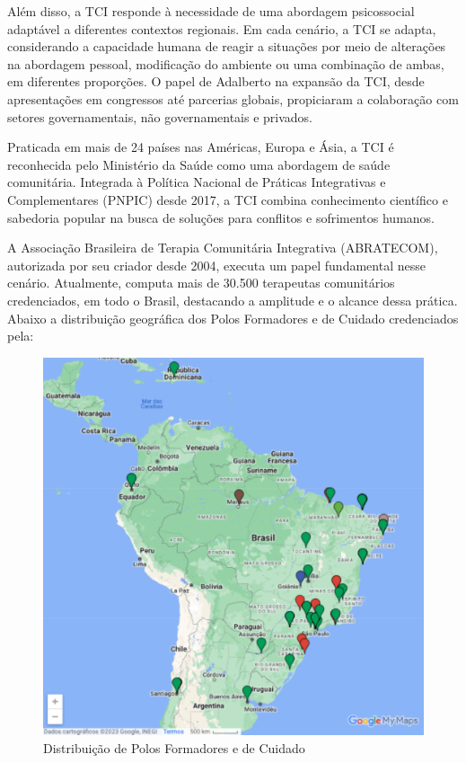         Além disso, a TCI responde à necessidade de uma abordagem psicossocial adaptável a diferentes contextos regionais. Em cada cenário, a TCI se adapta, considerando a capacidade humana de reagir a situações por meio de alterações na abordagem pessoal, modificação do ambiente ou uma combinação de ambas, em diferentes proporções.\cite{DANTAS} O papel de Adalberto na expansão da TCI, desde apresentações em congressos até parcerias globais, propiciaram a colaboração com setores governamentais, não governamentais e privados.\cite{GOMES}
        
        Praticada em mais de 24 países nas Américas, Europa e Ásia, a TCI é reconhecida pelo Ministério da Saúde como uma abordagem de saúde comunitária. Integrada à Política Nacional de Práticas Integrativas e Complementares (PNPIC) desde 2017, a TCI combina conhecimento científico e sabedoria popular na busca de soluções para conflitos e sofrimentos humanos.\cite{ABRATECOM}
        
        A Associação Brasileira de Terapia Comunitária Integrativa (ABRATECOM), autorizada por seu criador desde 2004, executa um papel fundamental nesse cenário. Atualmente, computa mais de 30.500 terapeutas comunitários credenciados, em todo o Brasil, destacando a amplitude e o alcance dessa prática.\cite{SILVAFRANCO} Abaixo a distribuição geográfica dos Polos Formadores e de Cuidado credenciados pela\cite{ABRATECOM}:
        
            \begin{figure}[!h] %
                \centering
                \includegraphics[scale=0.7]{latex/figuras/polos.pdf}
                \caption[Distribuição de Polos Formadores ABRATECOM]%
                {Distribuição de Polos Formadores e de Cuidado}%
            \end{figure}
        
